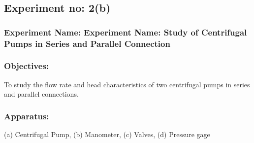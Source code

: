 \documentclass[12pt]{article}
\begin{document}
\pagebreak
\subsection*{Experiment no: 2(b)}
\subsubsection*{Experiment Name: Experiment Name: Study of Centrifugal Pumps in Series and Parallel Connection} 

\vspace*{.5cm}
\subsubsection*{Objectives:}
To study the flow rate and head characteristics of two centrifugal pumps in series and parallel connections. 
\subsubsection*{Apparatus:}
  (a) Centrifugal Pump, 
  (b) Manometer, 
  (c) Valves, 
  (d) Pressure gage 
\end{document}
